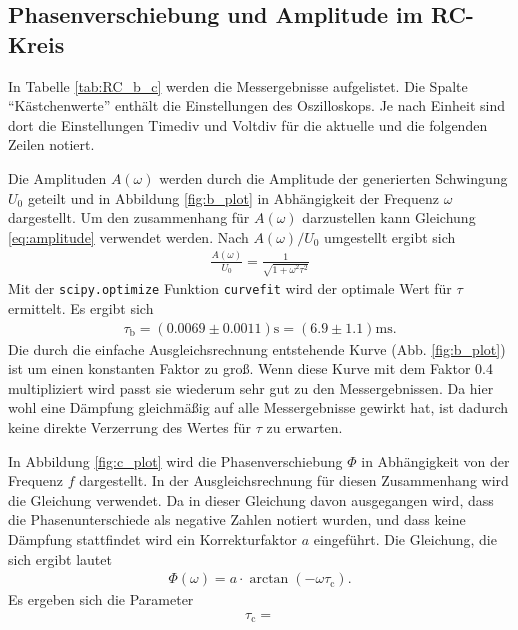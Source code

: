 \subsection{Phasenverschiebung und Amplitude im RC-Kreis}
In Tabelle \ref{tab:RC_b_c} werden die Messergebnisse aufgelistet. 
Die Spalte \enquote{Kästchenwerte} enthält die Einstellungen des Oszilloskops.
Je nach Einheit sind dort die Einstellungen Timediv und Voltdiv für die aktuelle und die folgenden Zeilen notiert.
%

%
Die Amplituden $A(\omega)$ werden durch die Amplitude der generierten Schwingung $U_0$ geteilt und in Abbildung \ref{fig:b_plot}
in Abhängigkeit der Frequenz $\omega$ dargestellt.
Um den zusammenhang für $A(\omega)$ darzustellen kann Gleichung \ref{eq:amplitude} verwendet werden.
Nach $A(\omega) / U_0$ umgestellt ergibt sich
\begin{align*}
    \frac{A(\omega)}{U_0} = \frac{1}{\sqrt{1 + \omega^2  \tau^2}}
\end{align*}
Mit der \texttt{scipy.optimize} Funktion \texttt{curvefit} \cite{scipy} wird der optimale Wert für $\tau$ ermittelt.
Es ergibt sich 
\begin{align}
    \tau_\text{b} = (\num{0.0069}\pm \num{0.0011})\unit{\s} =(\num{6.9}\pm \num{1.1})\unit{\milli\s}.
    \label{eq:tau_b}
\end{align}
Die durch die einfache Ausgleichsrechnung entstehende Kurve (Abb. \ref{fig:b_plot}) ist um einen konstanten Faktor zu groß.
Wenn diese Kurve mit dem Faktor \num{0.4} multipliziert wird passt sie wiederum sehr gut zu den Messergebnissen.
Da hier wohl eine Dämpfung gleichmäßig auf alle Messergebnisse gewirkt hat,
ist dadurch keine direkte Verzerrung des Wertes für $\tau$ zu erwarten.
%


In Abbildung \ref{fig:c_plot} wird die Phasenverschiebung $\Phi$ in Abhängigkeit von der Frequenz $f$ dargestellt.
In der Ausgleichsrechnung für diesen Zusammenhang wird die Gleichung  verwendet.
Da in dieser Gleichung davon ausgegangen wird, dass die Phasenunterschiede als negative Zahlen notiert wurden,
und dass keine Dämpfung stattfindet wird ein Korrekturfaktor $a$ eingeführt.
Die Gleichung, die sich ergibt lautet
\begin{align*}
    \Phi(\omega) = a \cdot \arctan(- \omega \tau_\text{c}).
\end{align*}
Es ergeben sich die Parameter
\begin{align}
    \tau_\text{c} = 
\end{align}
% 


